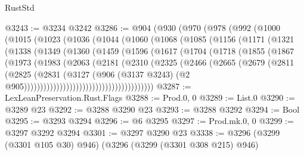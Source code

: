 \begin{lexlean}{RustStd}
\begin{coremodule}
{\begin{coremodule}
{{{{{{{{{{{{{{{{{{{{{{{{{{{{{{{@3243 := @3234 @3242
@3286 := @904
    (@930
      (@970
        (@978
          (@992
            (@1000
              (@1015
                (@1023
                  (@1036
                    (@1044
                      (@1060
                        (@1068
                          (@1085
                            (@1156
                              (@1171
                                (@1321
                                  (@1338
                                    (@1349
                                      (@1360
                                        (@1459
                                          (@1596
                                            (@1617
                                              (@1704
                                                (@1718
                                                  (@1855
                                                    (@1867
                                                      (@1973
                                                        (@1983
                                                          (@2063
                                                            (@2181
                                                              (@2310
                                                                (@2325
                                                                  (@2466
                                                                    (@2665
                                                                      (@2679
                                                                        (@2811
                                                                          (@2825
                                                                            (@2831
                                                                              (@3127
                                                                                (@906
                                                                                  (@3137 @3243)
                                                                                  (@2
                                                                                    @905))))))))))))))))))))))))))))))))))))))))
@3287 := LexLeanPreservation.Rust.Flags
@3288 := Prod.{0, 0}
@3289 := List.{0}
@3290 := @3289 @23
@3292 := @3288 @3290 @23
@3293 := @3288 @3292
@3294 := Bool
@3295 := @3293 @3294
@3296 := @6 @3295
@3297 := Prod.mk.{0, 0}
@3299 := @3297 @3292 @3294
@3301 := @3297 @3290 @23
@3338 := @3296
    (@3299 (@3301 @105 @30) @946)
    (@3296
      (@3299 (@3301 @308 @215) @946)
}}}}}}}}}}}}}}}}}}}}}}}}}}}}}}}
\end{coremodule}}
\end{coremodule}
\end{lexlean}
